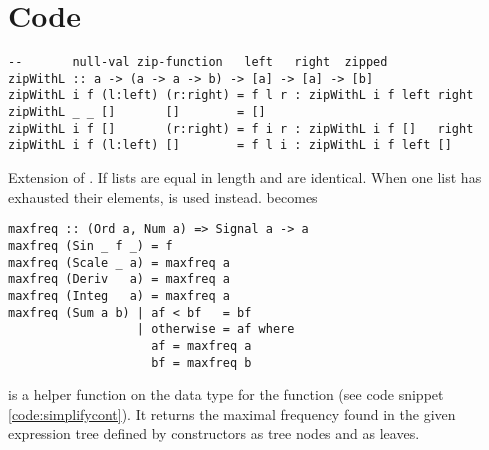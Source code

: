 
\section{Code}\label{sec:appcode}
\begin{codefig}
\begin{verbatim}
--       null-val zip-function   left   right  zipped
zipWithL :: a -> (a -> a -> b) -> [a] -> [a] -> [b]
zipWithL i f (l:left) (r:right) = f l r : zipWithL i f left right
zipWithL _ _ []       []        = []
zipWithL i f []       (r:right) = f i r : zipWithL i f []   right
zipWithL i f (l:left) []        = f l i : zipWithL i f left []
\end{verbatim}
\caption{Extension of . If lists are equal in length  and  are identical. When one list has exhausted their elements,  is used instead.  becomes \cmd{[a0 `f` b0,}    \cmd{i `f` b4].}}
\label{sec:appcodezipwithl}
\end{codefig}

\begin{codefig}
\begin{verbatim}
maxfreq :: (Ord a, Num a) => Signal a -> a
maxfreq (Sin _ f _) = f
maxfreq (Scale _ a) = maxfreq a
maxfreq (Deriv   a) = maxfreq a
maxfreq (Integ   a) = maxfreq a
maxfreq (Sum a b) | af < bf   = bf
                  | otherwise = af where
                    af = maxfreq a
                    bf = maxfreq b
\end{verbatim}
\caption{ is a helper function on the  data type for the function  (see code snippet \ref{code:simplifycont}). It returns the maximal frequency found in the given  expression tree defined by  constructors as tree nodes and  as leaves.}
\label{sec:appcodemaxfreq}
\end{codefig}


